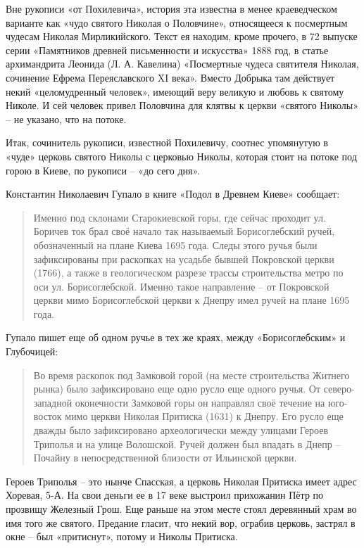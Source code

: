 Вне рукописи «от Похилевича», история эта известна в менее краеведческом варианте как «чудо святого Николая о Половчине», относящееся к посмертным чудесам Николая Мирликийского. Текст ея находим, кроме прочего, в 72 выпуске серии «Памятников древней письменности и искусства» 1888 год, в статье архимандрита Леонида (Л. А. Кавелина) «Посмертные чудеса святителя Николая, сочинение Ефрема Переяславского XI века». Вместо Добрыка там действует некий «целомудренный человек», имеющий веру великую и любовь к святому Николе. И сей человек привел Половчина для клятвы к церкви «святого Николы» – не указано, что на потоке.

Итак, сочинитель рукописи, известной Похилевичу, соотнес упомянутую в «чуде» церковь святого Николы с церковью Николы, которая стоит на потоке под горою в Киеве, по рукописи – «до сего дня».

Константин Николаевич Гупало в книге «Подол в Древнем Киеве» сообщает:

\begin{quotation}
Именно под склонами Старокиевской горы, где сейчас проходит ул. Боричев ток брал своё начало так называемый Борисоглебский ручей, обозначенный на плане Киева 1695 года. Следы этого ручья были зафиксированы при раскопках на усадьбе бывшей Покровской церкви (1766), а также в геологическом разрезе трассы строительства метро по оси ул. Борисоглебской. Именно такое направление – от Покровской церкви мимо Борисоглебской церкви к Днепру имел ручей на плане 1695 года.
\end{quotation}

Гупало пишет еще об одном ручье в тех же краях, между «Борисоглебским» и Глубочицей:

\begin{quotation}
Во время раскопок под Замковой горой (на месте строительства Житнего рынка) было зафиксировано еще одно русло еще одного ручья. От северо-западной оконечности Замковой горы он направлял своё течение на юго-восток мимо церкви Николая Притиска (1631) к Днепру. Его русло еще дважды было зафиксировано археологически между улицами Героев Триполья и на улице Волошской. Ручей должен был впадать в Днепр – Почайну в непосредственной близости от Ильинской церкви.
\end{quotation}

Героев Триполья – это нынче Спасская, а церковь Николая Притиска имеет адрес Хоревая, 5-А. На свои деньги ее в 17 веке выстроил прихожанин Пётр по прозвищу Железный Грош. Еще раньше на этом месте стоял деревянный храм во имя того же святого. Предание гласит, что некий вор, ограбив церковь, застрял в окне – был «притиснут», потому и Николы Притиска.

